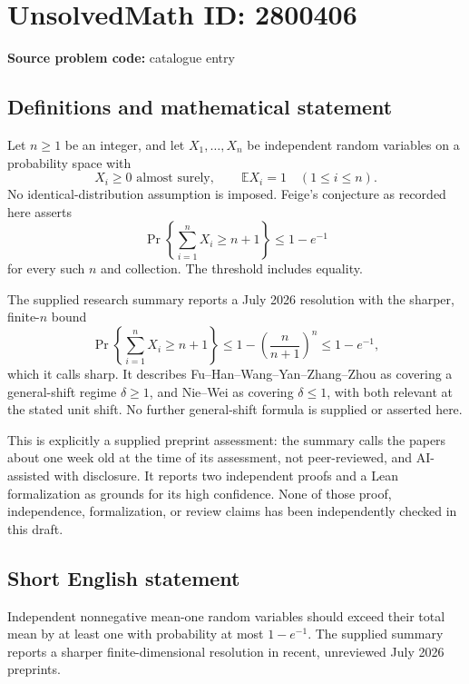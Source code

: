 \documentclass[11pt]{article}
\begin{document}
\section*{UnsolvedMath ID: 2800406}
\textbf{Source problem code:} catalogue entry
\subsection{Definitions and mathematical statement}
Let \(n\ge1\) be an integer, and let \(X_1,\ldots,X_n\) be independent random variables on a probability space with
\[
X_i\ge0\text{ almost surely},\qquad \mathbb E X_i=1\quad(1\le i\le n).
\]
No identical-distribution assumption is imposed. Feige's conjecture as recorded here asserts
\[
\Pr\left\{\sum_{i=1}^nX_i\ge n+1\right\}\le1-e^{-1}
\]
for every such \(n\) and collection. The threshold includes equality.

The supplied research summary reports a July 2026 resolution with the sharper, finite-\(n\) bound
\[
\Pr\left\{\sum_{i=1}^nX_i\ge n+1\right\}
\le1-\left(\frac n{n+1}\right)^n\le1-e^{-1},
\]
which it calls sharp. It describes Fu--Han--Wang--Yan--Zhang--Zhou as covering a general-shift regime \(\delta\ge1\), and Nie--Wei as covering \(\delta\le1\), with both relevant at the stated unit shift. No further general-shift formula is supplied or asserted here.

This is explicitly a supplied preprint assessment: the summary calls the papers about one week old at the time of its assessment, not peer-reviewed, and AI-assisted with disclosure. It reports two independent proofs and a Lean formalization as grounds for its high confidence. None of those proof, independence, formalization, or review claims has been independently checked in this draft.
\subsection{Short English statement}
Independent nonnegative mean-one random variables should exceed their total mean by at least one with probability at most \(1-e^{-1}\). The supplied summary reports a sharper finite-dimensional resolution in recent, unreviewed July 2026 preprints.
\end{document}
